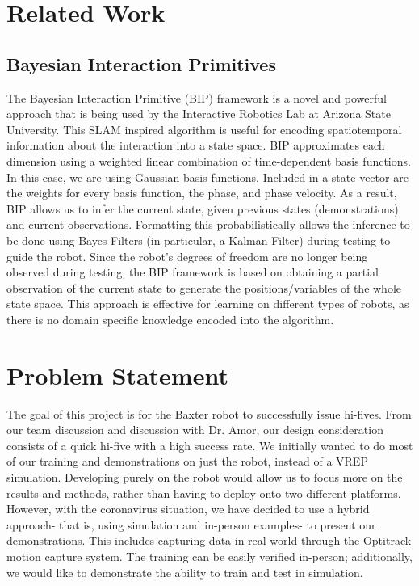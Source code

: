 \documentclass[letterpaper, 10 pt, conference]{ieeeconf}  %
\begin{document}
\section{Related Work}

\subsection{Bayesian Interaction Primitives}
The Bayesian Interaction Primitive (BIP) framework is a novel and powerful approach that is being used by the Interactive Robotics Lab at Arizona State University. This SLAM inspired algorithm is useful for encoding spatiotemporal information about the interaction into a state space. BIP approximates each dimension using a weighted linear combination of time-dependent basis functions. In this case, we are using Gaussian basis functions. Included in a state vector are the weights for every basis function, the phase, and phase velocity. As a result, BIP allows us to infer the current state, given previous states (demonstrations) and current observations. Formatting this probabilistically allows the inference to be done using Bayes Filters (in particular, a Kalman Filter) during testing to guide the robot. Since the robot's degrees of freedom are no longer being observed during testing, the BIP framework is based on obtaining a partial observation of the current state to generate the positions/variables of the whole state space. This approach is effective for learning on different types of robots, as there is no domain specific knowledge encoded into the algorithm.


\section{Problem Statement}
The goal of this project is for the Baxter robot to successfully issue hi-fives. From our team discussion and discussion with Dr. Amor, our design consideration consists of a quick hi-five with a high success rate. We initially wanted to do most of our training and demonstrations on just the robot, instead of a VREP simulation. Developing purely on the robot would allow us to focus more on the results and methods, rather than having to deploy onto two different platforms. 
\newline
\indent However, with the coronavirus situation, we have decided to use a hybrid approach- that is, using simulation and in-person examples- to present our demonstrations. This includes capturing data in real world through the Optitrack motion capture system. The training can be easily verified in-person; additionally, we would like to demonstrate the ability to train and test in simulation. 
\end{document}
